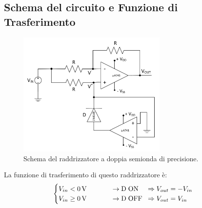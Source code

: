 \documentclass{report}
\begin{document}
\subsection{Schema del circuito e Funzione di Trasferimento}
\begin{figure}[h]
	\centering
	\includegraphics[height=6.2cm]{immagini/schema1}
	\caption{Schema del raddrizzatore a doppia semionda di precisione.}
	\label{figura:schema1}
\end{figure}
\noindent La funzione di trasferimento di questo raddrizzatore è:
\begin{equation}
   \begin{cases}
   V_{in}< \SI{0}{\volt}\;\;\indent\indent\rightarrow \mathrm{D\;ON}\;\;\;\; \Rightarrow V_{out} = -V_{in}\\
   V_{in}\ge \SI{0}{\volt}\;\;\indent\indent\rightarrow \mathrm{D\; OFF}\;\; \Rightarrow V_{out} = V_{in}
   \end{cases}
\end{equation}
\end{document}
